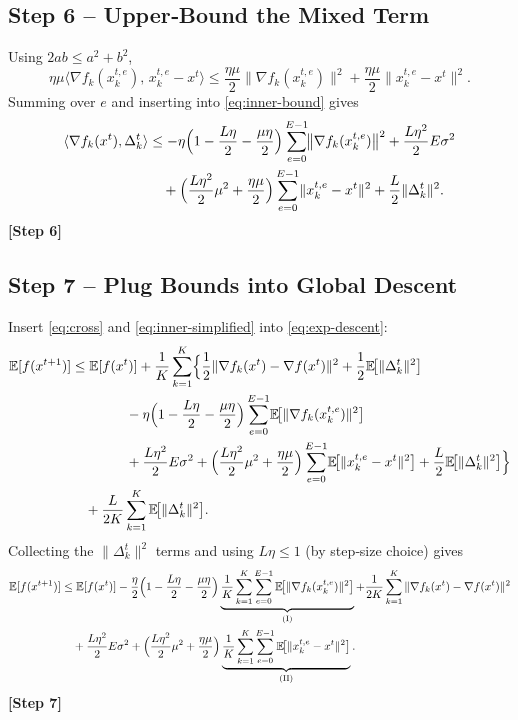 \documentclass{article}
\begin{document}
\subsection*{Step 6 – Upper‑Bound the Mixed Term}
Using $2ab\le a^{2}+b^{2}$,
\[
\eta\mu\langle \nabla f_k(x_{k}^{t,e}),\,x_{k}^{t,e}-x^{t}\rangle
\le \frac{\eta\mu}{2}\bigl\|\nabla f_k(x_{k}^{t,e})\bigr\|^{2}
   +\frac{\eta\mu}{2}\|x_{k}^{t,e}-x^{t}\|^{2}.
\]
Summing over $e$ and inserting into \eqref{eq:inner-bound} gives
\begin{align}
\langle \nabla f_k(x^{t}),\Delta_{k}^{t}\rangle
&\le
   -\eta\Bigl(1-\frac{L\eta}{2}-\frac{\mu\eta}{2}\Bigr)\sum_{e=0}^{E-1}\!\bigl\|\nabla f_k(x_{k}^{t,e})\bigr\|^{2}
   +\frac{L\eta^{2}}{2}E\sigma^{2} \nonumber\\
&\quad+\Bigl(\frac{L\eta^{2}}{2}\mu^{2}+\frac{\eta\mu}{2}\Bigr)\sum_{e=0}^{E-1}\!\|x_{k}^{t,e}-x^{t}\|^{2}
   +\frac{L}{2}\|\Delta_{k}^{t}\|^{2}. \label{eq:inner-simplified}
\end{align}
\textbf{[Step 6]}

\subsection*{Step 7 – Plug Bounds into Global Descent}
Insert \eqref{eq:cross} and \eqref{eq:inner-simplified} into \eqref{eq:exp-descent}:
\begin{align}
\mathbb{E}[f(x^{t+1})]
&\le \mathbb{E}[f(x^{t})]
   +\frac{1}{K}\sum_{k=1}^{K}\Bigl\{
        \frac{1}{2}\|\nabla f_k(x^{t})-\nabla f(x^{t})\|^{2}
        +\frac{1}{2}\mathbb{E}\!\bigl[\|\Delta_{k}^{t}\|^{2}\bigr] \nonumber\\
&\qquad\qquad
        -\eta\Bigl(1-\frac{L\eta}{2}-\frac{\mu\eta}{2}\Bigr)
           \sum_{e=0}^{E-1}\!\mathbb{E}\!\bigl[\|\nabla f_k(x_{k}^{t,e})\|^{2}\bigr] \nonumber\\
&\qquad\qquad
        +\frac{L\eta^{2}}{2}E\sigma^{2}
        +\Bigl(\frac{L\eta^{2}}{2}\mu^{2}+\frac{\eta\mu}{2}\Bigr)
           \sum_{e=0}^{E-1}\!\mathbb{E}\!\bigl[\|x_{k}^{t,e}-x^{t}\|^{2}\bigr]
        +\frac{L}{2}\mathbb{E}\!\bigl[\|\Delta_{k}^{t}\|^{2}\bigr]\Bigr\} \nonumber\\
&\quad +\frac{L}{2K}\sum_{k=1}^{K}\mathbb{E}\!\bigl[\|\Delta_{k}^{t}\|^{2}\bigr].
\end{align}
Collecting the $\|\Delta_{k}^{t}\|^{2}$ terms and using $L\eta\le 1$ (by step‑size choice) gives
\begin{align}
\mathbb{E}[f(x^{t+1})]
&\le \mathbb{E}[f(x^{t})]
   -\frac{\eta}{2}\Bigl(1-\frac{L\eta}{2}-\frac{\mu\eta}{2}\Bigr)
     \underbrace{\frac{1}{K}\sum_{k=1}^{K}\sum_{e=0}^{E-1}
          \mathbb{E}\!\bigl[\|\nabla f_k(x_{k}^{t,e})\|^{2}\bigr]}_{\text{(I)}}
   +\frac{1}{2K}\sum_{k=1}^{K}\|\nabla f_k(x^{t})-\nabla f(x^{t})\|^{2} \nonumber\\
&\quad +\frac{L\eta^{2}}{2}E\sigma^{2}
   +\Bigl(\frac{L\eta^{2}}{2}\mu^{2}+\frac{\eta\mu}{2}\Bigr)
          \underbrace{\frac{1}{K}\sum_{k=1}^{K}\sum_{e=0}^{E-1}
          \mathbb{E}\!\bigl[\|x_{k}^{t,e}-x^{t}\|^{2}\bigr]}_{\text{(II)}} .
\label{eq:pre-final}
\end{align}
\textbf{[Step 7]}
\end{document}
